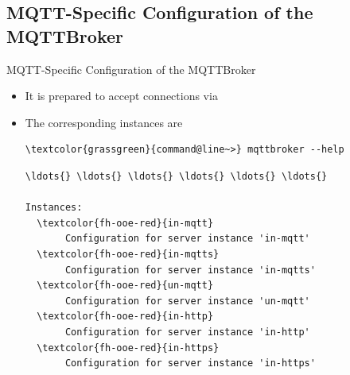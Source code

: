 ﻿\subsection[nosectionpage]{MQTT-Specific Configuration of the MQTTBroker}

\begin{frame}[fragile]{MQTT-Specific Configuration of the MQTTBroker}
\begin{itemize}
\item It is prepared to accept connections via
\item The corresponding instances are
\begin{scriptsize}
\begin{Verbatim}[commandchars=\\\{\}]
\textcolor{grassgreen}{command@line~>} mqttbroker --help
\end{Verbatim}
\begin{Verbatim}[commandchars=\\\{\},frame=leftline,rulecolor=\color{fh-ooe-red}]
\ldots{} \ldots{} \ldots{} \ldots{} \ldots{} \ldots{}

Instances:
  \textcolor{fh-ooe-red}{in-mqtt}
       Configuration for server instance 'in-mqtt'
  \textcolor{fh-ooe-red}{in-mqtts}
       Configuration for server instance 'in-mqtts'
  \textcolor{fh-ooe-red}{un-mqtt}
       Configuration for server instance 'un-mqtt'
  \textcolor{fh-ooe-red}{in-http}
       Configuration for server instance 'in-http'
  \textcolor{fh-ooe-red}{in-https}
       Configuration for server instance 'in-https'
\end{Verbatim}
\end{scriptsize}
\end{itemize}
\end{frame}
